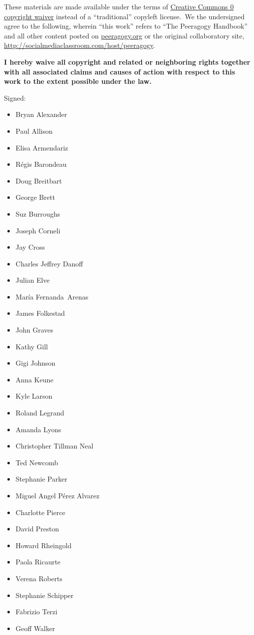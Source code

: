 These materials are made available under the terms of
\href{http://creativecommons.org/publicdomain/zero/1.0/}{Creative
Commons 0 copyright waiver} instead of a ``traditional'' copyleft
license.~We the undersigned agree to the following, wherein ``this
work'' refers to ``The Peeragogy Handbook'' and all other content posted
on \href{http://peeragogy.org}{peeragogy.org} or the original
collaboratory site,
\href{http://socialmediaclassroom.com/host/peeragogy}{http://socialmediaclassroom.com/host/peeragogy}.

\textbf{I hereby waive all copyright and related or neighboring rights
together with all associated claims and causes of action with respect to
this work to the extent possible under the law.}

Signed:

\begin{itemize}
\itemsep1pt\parskip0pt
\item
  Bryan Alexander
\item
  Paul Allison
\item
  Elisa Armendariz
\item
  Régis Barondeau
\item
  Doug Breitbart
\item
  George Brett
\item
  Suz Burroughs
\item
  Joseph Corneli
\item
  Jay Cross
\item
  Charles Jeffrey Danoff
\item
  Julian Elve
\item
  María Fernanda~Arenas
\item
  James Folkestad
\item
  John Graves
\item
  Kathy Gill
\item
  Gigi Johnson
\item
  Anna Keune
\item
  Kyle Larson
\item
  Roland Legrand
\item
  Amanda Lyons
\item
  Christopher Tillman Neal
\item
  Ted Newcomb
\item
  Stephanie Parker
\item
  Miguel Angel Pérez Alvarez
\item
  Charlotte Pierce
\item
  David Preston
\item
  Howard Rheingold
\item
  Paola Ricaurte
\item
  Verena Roberts
\item
  Stephanie Schipper
\item
  Fabrizio Terzi
\item
  Geoff Walker
\end{itemize}

